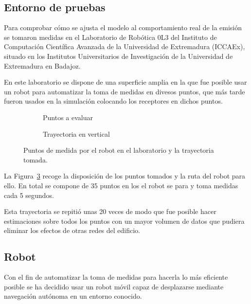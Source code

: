 \subsection{Entorno de pruebas}

Para comprobar cómo se ajusta el modelo al comportamiento real de la emisión se tomaron medidas en el Laboratorio de Robótica 0L3 del Instituto de Computación Científica Avanzada de la Universidad de Extremadura (ICCAEx), situado en los Institutos Universitarios de Investigación de la Universidad de Extremadura en Badajoz.

En este laboratorio se dispone de una superficie amplia en la que fue posible usar un robot para automatizar la toma de medidas en divesos puntos, que más tarde fueron usados en la simulación colocando los receptores en dichos puntos.

\begin{figure}[H]
    \begin{subfigure}[b]{.45\textwidth}
      \centering
      \def\svgwidth{0.6\linewidth}
	     
      \caption{Puntos a evaluar}
      \label{fig:puntos}
    \end{subfigure}
    \begin{subfigure}[b]{.45\textwidth}
        \centering
        \def\svgwidth{0.6\linewidth}
	     
        \caption{Trayectoria en vertical}
        \label{fig:vertical}
      \end{subfigure}
    \caption{Puntos de medida por el robot en el laboratorio y la trayectoria tomada.}
    \label{fig:laboratorio}
\end{figure}

La Figura~\ref{fig:laboratorio} recoge la disposición de los puntos tomados y la ruta del robot para ello.
En total se compone de 35 puntos en los el robot se para y toma medidas cada 5 segundos.

Esta trayectoria se repitió unas 20 veces de modo que fue posible hacer estimaciones sobre todos los puntos con un mayor volumen de datos que pudiera eliminar los efectos de otras redes del edificio.

\subsection{Robot}

Con el fin de automatizar la toma de medidas para hacerla lo más eficiente posible se ha decidido usar un robot móvil capaz de desplazarse mediante navegación autónoma en un entorno conocido.

